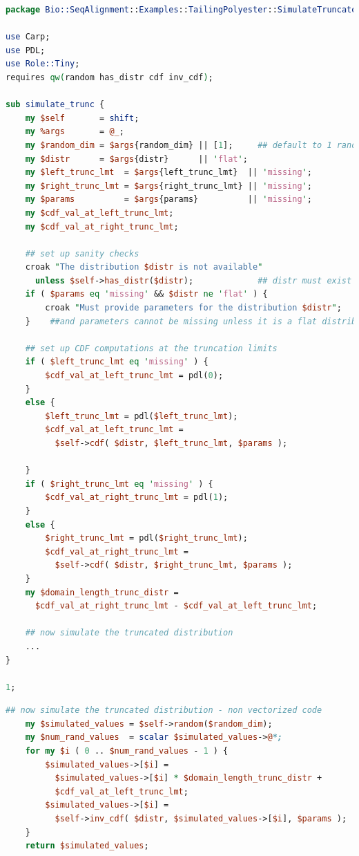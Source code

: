 \documentclass[10pt]{article}
\begin{document}
\begin{appendices}
\begin{lstlisting}[language=Perl,basicstyle=\footnotesize,frame=single,caption={An API for the Inverse CDF method.},label={lst:RNGSimulator},captionpos=b]
package Bio::SeqAlignment::Examples::TailingPolyester::SimulateTruncatedRNGPDL;

use Carp;
use PDL;
use Role::Tiny;
requires qw(random has_distr cdf inv_cdf);

sub simulate_trunc {
    my $self       = shift;
    my %args       = @_;
    my $random_dim = $args{random_dim} || [1];     ## default to 1 random number
    my $distr      = $args{distr}      || 'flat';
    my $left_trunc_lmt  = $args{left_trunc_lmt}  || 'missing';
    my $right_trunc_lmt = $args{right_trunc_lmt} || 'missing';
    my $params          = $args{params}          || 'missing';
    my $cdf_val_at_left_trunc_lmt;
    my $cdf_val_at_right_trunc_lmt;

    ## set up sanity checks
    croak "The distribution $distr is not available"
      unless $self->has_distr($distr);             ## distr must exist
    if ( $params eq 'missing' && $distr ne 'flat' ) {
        croak "Must provide parameters for the distribution $distr";
    }    ##and parameters cannot be missing unless it is a flat distribution

    ## set up CDF computations at the truncation limits
    if ( $left_trunc_lmt eq 'missing' ) {
        $cdf_val_at_left_trunc_lmt = pdl(0);
    }
    else {
        $left_trunc_lmt = pdl($left_trunc_lmt);
        $cdf_val_at_left_trunc_lmt =
          $self->cdf( $distr, $left_trunc_lmt, $params );

    }
    if ( $right_trunc_lmt eq 'missing' ) {
        $cdf_val_at_right_trunc_lmt = pdl(1);
    }
    else {
        $right_trunc_lmt = pdl($right_trunc_lmt);
        $cdf_val_at_right_trunc_lmt =
          $self->cdf( $distr, $right_trunc_lmt, $params );
    }
    my $domain_length_trunc_distr =
      $cdf_val_at_right_trunc_lmt - $cdf_val_at_left_trunc_lmt;

    ## now simulate the truncated distribution
    ...
}

1;
\end{lstlisting}
\newpage
\begin{lstlisting}[language=Perl,basicstyle=\footnotesize,frame=single,caption={The inverse CDF calculations in base Perl.},label={lst:InvCDFWithPDL2},captionpos=b]
    ## now simulate the truncated distribution - non vectorized code
    my $simulated_values = $self->random($random_dim);
    my $num_rand_values  = scalar $simulated_values->@*;
    for my $i ( 0 .. $num_rand_values - 1 ) {
        $simulated_values->[$i] =
          $simulated_values->[$i] * $domain_length_trunc_distr +
          $cdf_val_at_left_trunc_lmt;
        $simulated_values->[$i] =
          $self->inv_cdf( $distr, $simulated_values->[$i], $params );
    }
    return $simulated_values;
\end{lstlisting}


\end{appendices}
\end{document}
